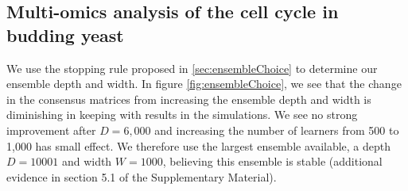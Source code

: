 \documentclass{bmcart}
\begin{document}



\subsection*{Multi-omics analysis of the cell cycle in budding yeast}

We use the stopping rule proposed in \ref{sec:ensembleChoice} to determine our ensemble depth and width. In figure \ref{fig:ensembleChoice}, we see that the change in the consensus matrices from increasing the ensemble depth and width is diminishing in keeping with results in the simulations. We see no strong improvement after $D=6,000$ and increasing the number of learners from 500 to 1,000 has small effect. We therefore use the largest ensemble available, a depth $D=10001$ and width $W=1000$, believing this ensemble is stable (additional evidence in section 5.1 of the Supplementary Material).
\end{document}

